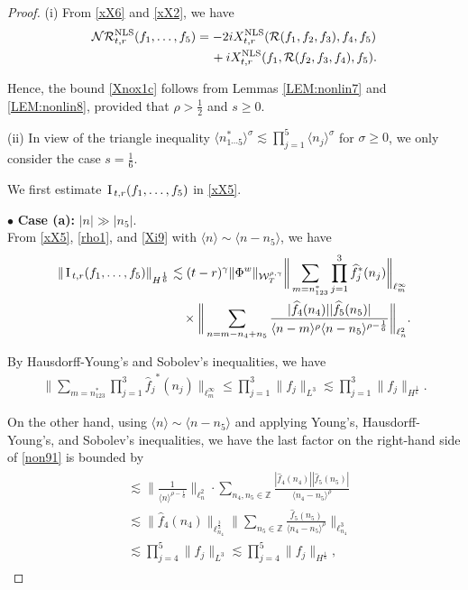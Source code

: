 \documentclass[letterpaper, 11pt,  reqno]{amsart}
\newcommand{\1}{\hspace{0.5mm}\text{I}\hspace{0.5mm}}
\newcommand{\noi}{\noindent}
\newcommand{\Z}{\mathbb{Z}}
\newcommand{\bul}{\bullet}
\newcommand{\RR}{\mathcal{R}}
\newcommand{\g}{\gamma}
\newcommand{\s}{\sigma}
\newcommand{\ft}{\widehat}
\renewcommand{\l}{\ell}
\newcommand{\les}{\lesssim}
\newcommand{\jb}[1]
{\langle #1 \rangle}
\newcommand{\NN}{\mathcal{N}}
\newcommand{\W}{\mathcal{W}}
\newcommand{\NLS}{\text{\rm NLS} }
\numberwithin{equation}{section}
\numberwithin{theorem}{section}
\begin{document}
\begin{proof}
(i) 
From 
\eqref{xX6} and  \eqref{xX2},  we have 
\begin{align*}
\NN \RR^\NLS_{t, r}(f_1, \dots, f_5)
& = -2i X^\NLS_{t,r}  ( \RR(f_1, f_2, f_3) , f _4, f_5)\\
& \,\quad + i X^\NLS_{t,r}  ( f_1, \RR(f_2, f_3, f_4) ,  f_5).
\end{align*}

\noi
Hence, the bound
\eqref{Xnox1c} follows from Lemmas \ref{LEM:nonlin7}
and \ref{LEM:nonlin8}, 
provided that $\rho > \frac 12 $ and $s \ge 0$.


\medskip





\noi
(ii) 
In view of the triangle inequality $\jb{n_{1\cdots5}^*}^\s \les \prod_{j= 1}^5 \jb{n_j}^\s$
for $\s \ge 0$, we only consider the case $s = \frac 16 $.


We first estimate $\1_{t, r}(f_1, \dots, f_5)$ in \eqref{xX5}.
\medskip


\noi
$\bul$ {\bf Case (a):} $|n|\gg |n_5|$.\\ %
\indent
From \eqref{xX5}, \eqref{rho1}, and \eqref{Xi9}
with 
$\jb{n} \sim \jb{n - n_5}$, 
we have 
\begin{align}
\begin{split}
 \|\1_{t, r}(f_1, \dots, f_5)\|_{H^\frac 16}
&  
\les 
(t - r)^\g
\|\Phi^w\|_{  \W^{\rho,\g}_T} 
\bigg\| \sum_{m = n_{123}^*}
\prod_{j = 1}^3
{\ft f_j}^*(n_j)\bigg\|_{\l^\infty_{m}}\\
& \quad \times \bigg\| 
\sum_{n = m - n_4 + n_5}
\frac {|\ft f_4(n_4)|  |\ft f_5(n_5)|}{\jb{n - m}^{\rho}\jb{n - n_5}^{\rho - \frac 16}}
\bigg\|_{\l^2_n}.
\end{split}
\label{non91}
\end{align}


\noi
By Hausdorff-Young's and Sobolev's inequalities, we have 
\begin{align}
\bigg\| \sum_{m = n_{123}^*}
\prod_{j = 1}^3
{\ft f_j}^*(n_j)\bigg\|_{\l^\infty_{m}}
\le \prod_{j = 1}^3 \|f_j\|_{L^3}\les \prod_{j = 1}^3 \|f_j\|_{H^\frac 16}.
\label{non92}
\end{align}


\noi
On the other hand, 
using  $\jb{n} \sim \jb{n - n_5}$
and applying Young's,  
Hausdorff-Young's,  and Sobolev's inequalities, we have 
the last factor on the right-hand side of \eqref{non91} is bounded by 
\begin{align}
\begin{split}
& \les 
\bigg\|\frac 1{\jb{n}^{\rho - \frac 16}}
\bigg\|_{\l^2_n}
\cdot \sum_{n_4, n_5 \in \Z}
\frac {|\ft f_4(n_4)|  |\ft f_5(n_5)|}{\jb{n_4 - n_5}^{\rho}}\\
& \les 
\| \ft f_4(n_4)\|_{\l^\frac 32_{n_4}}  
\bigg\|
\sum_{n_5 \in \Z}
\frac{\ft f_5(n_5)}{\jb{n_4 - n_5}^{\rho}}\bigg\|_{\l^3_{n_4}}\\
& \les \prod_{j = 4}^5 \|f_j\|_{L^3}\les \prod_{j = 4}^5 \|f_j\|_{H^\frac 16}, 
\end{split}
\label{non93}
\end{align}


\end{proof}
\end{document}
